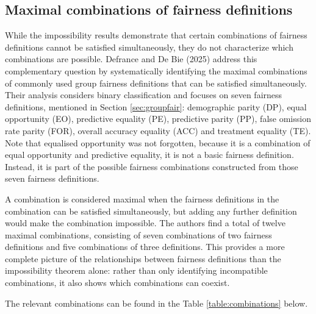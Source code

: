 \subsection{Maximal combinations of fairness definitions}
While the impossibility results demonstrate that certain combinations of fairness definitions cannot be satisfied simultaneously, they do not characterize which combinations are possible. Defrance and De Bie (2025) \cite{max_combinations} address this complementary question by systematically identifying the maximal combinations of commonly used group fairness definitions that can be satisfied simultaneously. Their analysis considers binary classification and focuses on seven fairness definitions, mentioned in Section \ref{sec:groupfair}: demographic parity (DP), equal opportunity (EO), predictive equality (PE), predictive parity (PP), false omission rate parity (FOR), overall accuracy equality (ACC) and treatment equality (TE). Note that equalised opportunity was not forgotten, because it is a combination of equal opportunity and predictive equality, it is not a basic fairness definition. Instead, it is part of the possible fairness combinations constructed from those seven fairness definitions.

A combination is considered maximal when the fairness definitions in the combination can be satisfied simultaneously, but adding any further definition would make the combination impossible. The authors find a total of twelve maximal combinations, consisting of seven combinations of two fairness definitions and five combinations of three definitions. This provides a more complete picture of the relationships between fairness definitions than the impossibility theorem alone: rather than only identifying incompatible combinations, it also shows which combinations can coexist.


The relevant combinations can be found in the Table \ref{table:combinations} below.

